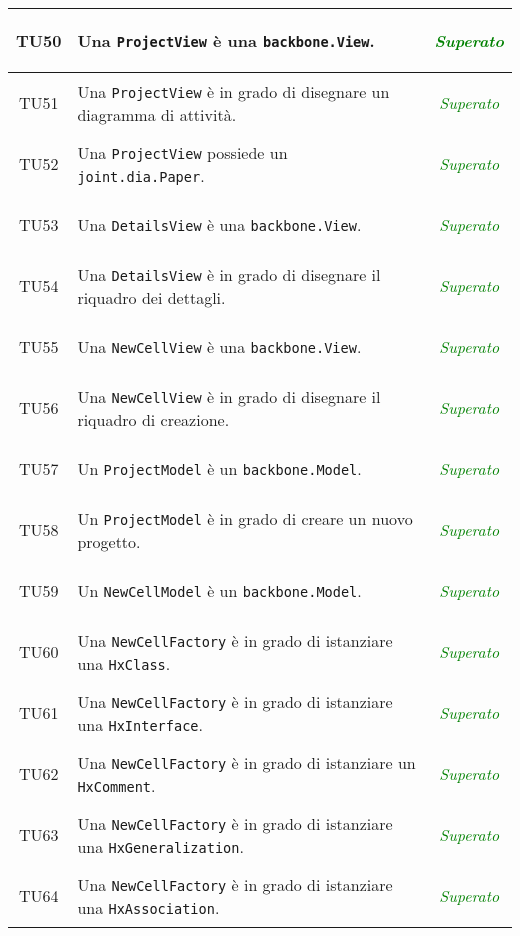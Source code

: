 \begin{longtable}{|c|>{}m{8cm}|c|}
\hypertarget{TU50}{TU50} & Una \texttt{ProjectView} è una \texttt{backbone.View}. & \textcolor{Green}{\textit{Superato}}\\ \hline
\hypertarget{TU51}{TU51} & Una \texttt{ProjectView} è in grado di disegnare un diagramma di attività. & \textcolor{Green}{\textit{Superato}}\\ \hline
\hypertarget{TU52}{TU52} & Una \texttt{ProjectView} possiede un \texttt{joint.dia.Paper}. & \textcolor{Green}{\textit{Superato}}\\ \hline
\hypertarget{TU53}{TU53} & Una \texttt{DetailsView} è una \texttt{backbone.View}. & \textcolor{Green}{\textit{Superato}}\\ \hline
\hypertarget{TU54}{TU54} & Una \texttt{DetailsView} è in grado di disegnare il riquadro dei dettagli. & \textcolor{Green}{\textit{Superato}}\\ \hline
\hypertarget{TU55}{TU55} & Una \texttt{NewCellView} è una \texttt{backbone.View}. & \textcolor{Green}{\textit{Superato}}\\ \hline
\hypertarget{TU56}{TU56} & Una \texttt{NewCellView} è in grado di disegnare il riquadro di creazione. & \textcolor{Green}{\textit{Superato}}\\ \hline
\hypertarget{TU57}{TU57} & Un \texttt{ProjectModel} è un \texttt{backbone.Model}. & \textcolor{Green}{\textit{Superato}}\\ \hline
\hypertarget{TU58}{TU58} & Un \texttt{ProjectModel} è in grado di creare un nuovo progetto. & \textcolor{Green}{\textit{Superato}}\\ \hline
\hypertarget{TU59}{TU59} & Un \texttt{NewCellModel} è un \texttt{backbone.Model}. & \textcolor{Green}{\textit{Superato}}\\ \hline
\hypertarget{TU60}{TU60} & Una \texttt{NewCellFactory} è in grado di istanziare una \texttt{HxClass}. & \textcolor{Green}{\textit{Superato}}\\ \hline
\hypertarget{TU61}{TU61} & Una \texttt{NewCellFactory} è in grado di istanziare una \texttt{HxInterface}. & \textcolor{Green}{\textit{Superato}}\\ \hline
\hypertarget{TU62}{TU62} & Una \texttt{NewCellFactory} è in grado di istanziare un \texttt{HxComment}. & \textcolor{Green}{\textit{Superato}}\\ \hline
\hypertarget{TU63}{TU63} & Una \texttt{NewCellFactory} è in grado di istanziare una \texttt{HxGeneralization}. & \textcolor{Green}{\textit{Superato}}\\ \hline
\hypertarget{TU64}{TU64} & Una \texttt{NewCellFactory} è in grado di istanziare una \texttt{HxAssociation}. & \textcolor{Green}{\textit{Superato}}\\ \hline

\end{longtable}
